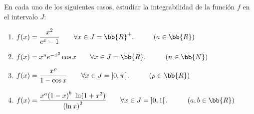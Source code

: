 \begin{ejercicio}
    En cada uno de los siguientes casos, estudiar la integrabilidad de la función $f$ en el intervalo $J$:
    \begin{enumerate}
        \item $f(x)=\dfrac{x^2}{e^x-1}\qquad \forall x\in J=\bb{R}^+.\hspace{1cm}(a\in \bb{R})$
        \item $f(x)=x^n e^{-x^2}\cos x \qquad \forall x\in J=\bb{R}.\hspace{1cm}(n\in \bb{N})$
        \item $f(x)=\dfrac{x^\rho}{1-\cos x} \qquad \forall x\in J=\left]0,\pi\right[.\hspace{1cm}(\rho\in \bb{R})$
        \item $f(x)=\dfrac{x^a{(1-x)}^b~\ln(1+x^2)}{{(\ln x)}^2} \qquad \forall x\in J=\left]0,1\right[.\hspace{1cm}(a,b\in \bb{R})$
    \end{enumerate}
\end{ejercicio}
